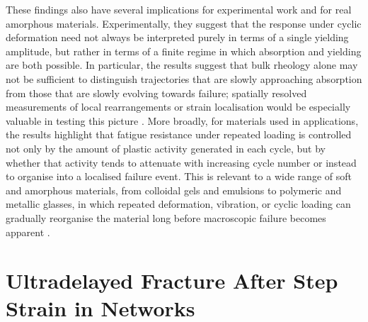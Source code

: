 These findings also have several implications for experimental work and for real amorphous materials. Experimentally, they suggest that the response under cyclic deformation need not always be interpreted purely in terms of a single yielding amplitude, but rather in terms of a finite regime in which absorption and yielding are both possible. In particular, the results suggest that bulk rheology alone may not be sufficient to distinguish trajectories that are slowly approaching absorption from those that are slowly evolving towards failure; spatially resolved measurements of local rearrangements or strain localisation would be especially valuable in testing this picture \cite{divoux_stress_2011,divouxTransientShearBanding2010,divoux_yielding_2012,grenard_timescales_2014,gibaud_heterogeneous_2010}. More broadly, for materials used in applications, the results highlight that fatigue resistance under repeated loading is controlled not only by the amount of plastic activity generated in each cycle, but by whether that activity tends to attenuate with increasing cycle number or instead to organise into a localised failure event. This is relevant to a wide range of soft and amorphous materials, from colloidal gels and emulsions to polymeric and metallic glasses, in which repeated deformation, vibration, or cyclic loading can gradually reorganise the material long before macroscopic failure becomes apparent \cite{bonn_yield_2017,SCHUH2007,hufnagel_deformation_2016,greer_shear_2013}.

\section*{Ultradelayed Fracture After Step Strain in Networks}

